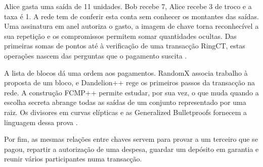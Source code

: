 Alice gasta uma saída de 11 unidades. Bob recebe 7, Alice recebe 3 de
troco e a taxa é 1. A rede tem de conferir esta conta sem conhecer
os montantes das saídas. Uma assinatura em anel autoriza o gasto, a
imagem de chave torna reconhecível a sua repetição e os compromissos
permitem somar quantidades ocultas. Das primeiras somas de pontos até
à verificação de uma transacção RingCT, estas operações nascem das
perguntas que o pagamento suscita \cite{MRL-0005-ringct}.

A lista de blocos dá uma ordem aos pagamentos. RandomX associa trabalho
à proposta de um bloco, e Dandelion++ rege os primeiros passos da
transacção na rede. A construção FCMP++ permite estudar, por sua vez,
o que muda quando a escolha secreta abrange todas as saídas de um
conjunto representado por uma raiz. Os divisores em curvas elípticas
e as Generalized Bulletproofs fornecem a linguagem dessa prova
\cite{eagen-divisors,curve-trees,fcmp-plus-plus-paper}.

Por fim, as mesmas relações entre chaves servem para provar a um
terceiro que se pagou, repartir a autorização de uma despesa, guardar
um depósito em garantia e reunir vários participantes numa transacção.
